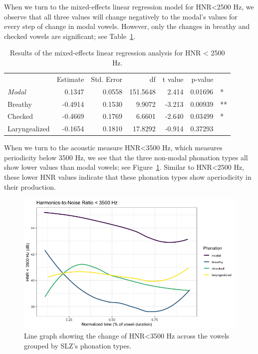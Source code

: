 \documentclass[12pt, letterpaper]{article}
\providecommand{\lsptoprule}{\midrule\toprule}
\providecommand{\lspbottomrule}{\bottomrule\midrule}
\begin{document}
When we turn to the mixed-effects linear regression model for HNR<2500 Hz, we observe that all three values will change negatively to the modal's values for every step of change in modal vowels. However, only the changes in breathy and checked vowels are significant; see Table~\ref*{tab:HNR25}.
\begin{table}[!h]
    \centering
    \caption{Results of the mixed-effects linear regression analysis for HNR < 2500 Hz.}
    \label{tab:HNR25}
    \begin{tabular}{lrrrrrl}
	\lsptoprule
					&  Estimate  & Std. Error & df & t value & p-value & \\
        \textit{Modal}  &  0.1347	& 0.0558 & 151.5648 &  2.414 & 0.01696 & * \\  
  	Breathy   		&  -0.4914 	& 0.1530 &  9.9072  & -3.213 & 0.00939 & ** \\
	Checked    		&  -0.4669  & 0.1769 &  6.6601  & -2.640 & 0.03499 & * \\
	Laryngealized	&  -0.1654  & 0.1810 & 17.8292  & -0.914 & 0.37293 & \\
    \lspbottomrule
    \end{tabular}
\end{table}

When we turn to the acoustic measure HNR<3500 Hz, which measures periodicity below 3500 Hz, we see that the three non-modal phonation types all show lower values than modal vowels; see Figure~\ref*{fig:HNR35}. Similar to HNR<2500 Hz, these lower HNR values indicate that these phonation types show aperiodicity in their production. 
\begin{figure}[!h]
	\centering
	\includegraphics[width=.75\linewidth]{Images/HNR35.png}
	\caption{Line graph showing the change of HNR\textless 3500 Hz across the vowels grouped by SLZ's phonation types.}
	\label{fig:HNR35}
\end{figure}
\end{document}
